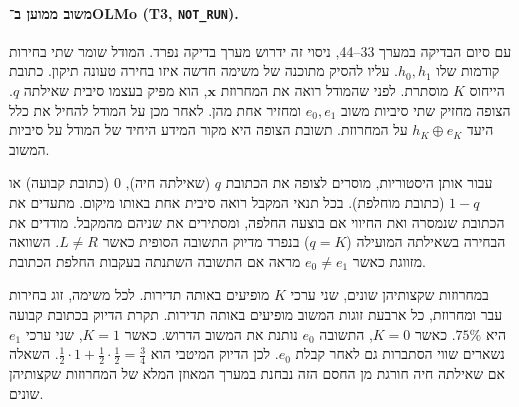 \documentclass[11pt,a4paper]{article}
\DeclareRobustCommand{\textenglish}[1]{\foreignlanguage{english}{#1}}
\theoremstyle{definition}
\begin{document}
\paragraph{משוב ממוען ב־\textenglish{OLMo (T3, \texttt{NOT\_RUN})}.}
עם סיום הבדיקה במערך 33--44, ניסוי זה ידרוש מערך בדיקה נפרד. המודל שומר שתי בחירות קודמות שלו $h_0,h_1$. עליו להסיק מתוכנה של משימה חדשה איזו בחירה טעונה תיקון. כתובת הייחוס $K$ מוסתרת. לפני שהמודל רואה את המחרוזת $\mathbf{x}$, הוא מפיק בעצמו סיבית שאילתה $q$. הצופה מחזיק שתי סיביות משוב $e_0,e_1$ ומחזיר אחת מהן. לאחר מכן על המודל להחיל את כלל היעד $h_K\oplus e_K$ על המחרוזת. תשובת הצופה היא מקור המידע היחיד של המודל על סיביות המשוב.

עבור אותן היסטוריות, מוסרים לצופה את הכתובת $q$ (שאילתה חיה), $0$ (כתובת קבועה) או $1-q$ (כתובת מוחלפת). בכל תנאי המקבל רואה סיבית אחת באותו מיקום. מתעדים את הכתובת שנמסרה ואת החיווי אם בוצעה החלפה, ומסתירים את שניהם מהמקבל. מודדים את הבחירה בשאילתה המועילה ($q=K$) בנפרד מדיוק התשובה הסופית כאשר $L\ne R$. השוואה מזווגת כאשר $e_0\ne e_1$ מראה אם התשובה השתנתה בעקבות החלפת הכתובת.

במחרוזות שקצותיהן שונים, שני ערכי $K$ מופיעים באותה תדירות. לכל משימה, זוג בחירות עבר ומחרוזת, כל ארבעת זוגות המשוב מופיעים באותה תדירות. תקרת הדיוק בכתובת קבועה היא $75\%$. כאשר $K=0$, התשובה $e_0$ נותנת את המשוב הדרוש. כאשר $K=1$, שני ערכי $e_1$ נשארים שווי הסתברות גם לאחר קבלת $e_0$. לכן הדיוק המיטבי הוא $\tfrac12\cdot1+\tfrac12\cdot\tfrac12=\tfrac34$. השאלה אם שאילתה חיה חורגת מן החסם הזה נבחנת במערך המאוזן המלא של המחרוזות שקצותיהן שונים.
\end{document}

